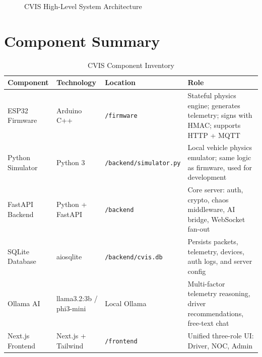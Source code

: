 \documentclass[12pt,a4paper]{report}
\begin{document}
\begin{figure}[H]
\caption{CVIS High-Level System Architecture}
\label{fig:architecture}
\end{figure}

\section{Component Summary}

\begin{table}[H]
\centering
\caption{CVIS Component Inventory}
\label{tab:components}
\begin{tabularx}{\textwidth}{L{2.5cm} L{2.5cm} L{2.5cm} X}
\toprule
\textbf{Component} & \textbf{Technology} & \textbf{Location} & \textbf{Role} \\
\midrule
ESP32 Firmware & Arduino C++ & \texttt{/firmware} & Stateful physics engine; generates telemetry; signs with HMAC; supports HTTP + MQTT \\
Python Simulator & Python 3 & \texttt{/backend/simulator.py} & Local vehicle physics emulator; same logic as firmware, used for development \\
FastAPI Backend & Python + FastAPI & \texttt{/backend} & Core server: auth, crypto, chaos middleware, AI bridge, WebSocket fan-out \\
SQLite Database & aiosqlite & \texttt{/backend/cvis.db} & Persists packets, telemetry, devices, auth logs, and server config \\
Ollama AI & llama3.2:3b / phi3-mini & Local Ollama & Multi-factor telemetry reasoning, driver recommendations, free-text chat \\
Next.js Frontend & Next.js + Tailwind & \texttt{/frontend} & Unified three-role UI: Driver, NOC, Admin \\
\bottomrule
\end{tabularx}
\end{table}
\end{document}

